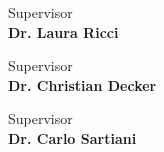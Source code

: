 \begin{titlepage}
\begin{minipage}[t]{0.47\textwidth}
	{\large{Supervisor}\bf\\ {Dr. Laura Ricci}}
\end{minipage}
\hfill
\begin{minipage}[t]{0.47\textwidth}
    \raggedleft
    {\large{Supervisor}\bf\\ {Dr. Christian Decker}}
\end{minipage}

\begin{center}
    {\large{Supervisor}\bf\\ {Dr. Carlo Sartiani}}
\end{center}

\vspace{5mm}

\end{titlepage}
